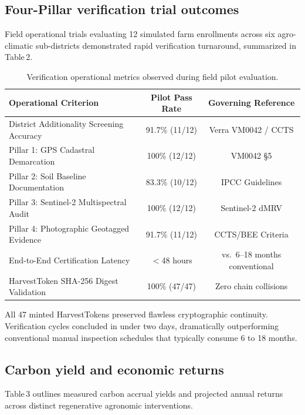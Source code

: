 \documentclass[a4paper,10pt]{article}
\begin{document}
\subsection{Four-Pillar verification trial outcomes}
Field operational trials evaluating 12 simulated farm enrollments across six agro-climatic sub-districts demonstrated rapid verification turnaround, summarized in Table\,2.

\begin{table}[htbp]
  \caption{Verification operational metrics observed during field pilot evaluation.}
  \label{tab:pilot}
  \centering
  \begin{tabular}{lcc}
    \toprule
    \textbf{Operational Criterion} & \textbf{Pilot Pass Rate} & \textbf{Governing Reference} \\
    \midrule
    District Additionality Screening Accuracy & 91.7\% (11/12) & Verra VM0042 / CCTS \\
    Pillar 1: GPS Cadastral Demarcation       & 100\% (12/12)  & VM0042 \S5 \\
    Pillar 2: Soil Baseline Documentation     & 83.3\% (10/12) & IPCC Guidelines \\
    Pillar 3: Sentinel-2 Multispectral Audit  & 100\% (12/12)  & Sentinel-2 dMRV \\
    Pillar 4: Photographic Geotagged Evidence & 91.7\% (11/12) & CCTS/BEE Criteria \\
    End-to-End Certification Latency          & $<$48 hours    & vs.\ 6--18 months conventional \\
    HarvestToken SHA-256 Digest Validation    & 100\% (47/47)  & Zero chain collisions \\
    \bottomrule
  \end{tabular}
\end{table}

All 47 minted HarvestTokens preserved flawless cryptographic continuity. Verification cycles concluded in under two days, dramatically outperforming conventional manual inspection schedules that typically consume 6 to 18 months.

\subsection{Carbon yield and economic returns}
Table\,3 outlines measured carbon accrual yields and projected annual returns across distinct regenerative agronomic interventions.
\end{document}
